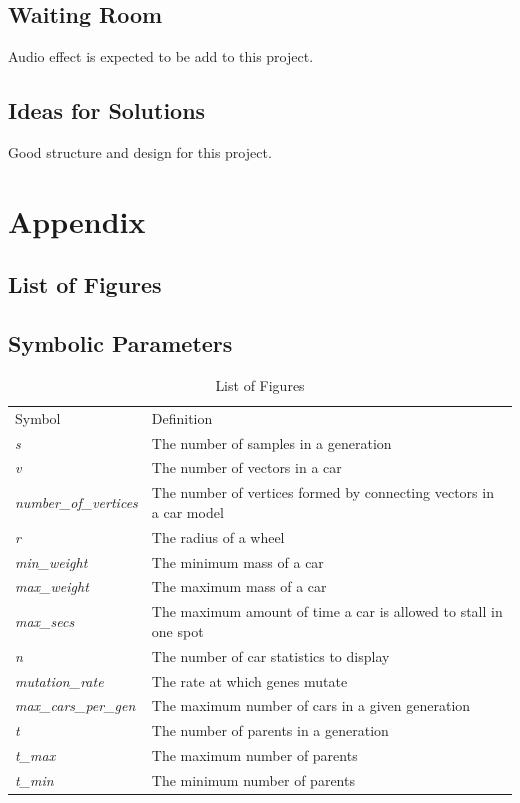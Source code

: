 \documentclass[12pt, titlepage]{article}
\begin{document}
\subsection{Waiting Room}
Audio effect is expected to be add to this project.

\subsection{Ideas for Solutions}
Good structure and design for this project.






\newpage

\section{Appendix}


\subsection{List of Figures}

\subsection{Symbolic Parameters}

\begin{table}[h!]
\centering
\label{LOF}
\begin{tabular}{ll}
Symbol & Definition \\
\textit{s} & The number of samples in a generation  \\
\textit{v} & The number of vectors in a car  \\
\textit{number\_of\_vertices} & The number of vertices formed by connecting 
vectors in a car model \\
\textit{r} & The radius of a wheel\\
\textit{min\_weight} & The minimum mass of a car\\
\textit{max\_weight} & The maximum mass of a car\\
\textit{max\_secs} & The maximum amount of time a car is allowed to stall in one 
spot\\
\textit{n} & The number of car statistics to display\\
\textit{mutation\_rate} & The rate at which genes mutate\\
\textit{max\_cars\_per\_gen} & The maximum number of cars in a given 
generation\\
\textit{t} & The number of parents in a generation\\
\textit{t\_max} & The maximum number of parents\\
\textit{t\_min} & The minimum number of parents\\
\end{tabular}
\caption{List of Figures}
\end{table}
\end{document}
